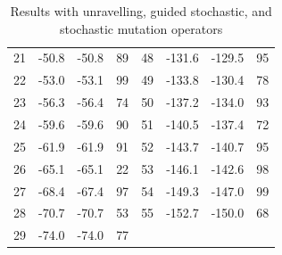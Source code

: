 \documentclass{article}
\begin{document}
\begin{table}[]
\begin{tabular}{cccc|cccc}
	21 & -50.8   & -50.8 & 89   & 48 & -131.6  & -129.5 & 95   \\
	22 & -53.0   & -53.1 & 99   & 49 & -133.8  & -130.4 & 78   \\
	23 & -56.3   & -56.4 & 74   & 50 & -137.2  & -134.0 & 93   \\
	24 & -59.6   & -59.6 & 90   & 51 & -140.5  & -137.4 & 72   \\
	25 & -61.9   & -61.9 & 91   & 52 & -143.7  & -140.7 & 95   \\
	26 & -65.1   & -65.1 & 22   & 53 & -146.1  & -142.6 & 98   \\
	27 & -68.4   & -67.4 & 97   & 54 & -149.3  & -147.0 & 99   \\
	28 & -70.7   & -70.7 & 53   & 55 & -152.7  & -150.0 & 68   \\
	29 & -74.0   & -74.0 & 77   &    &         &        &      \\

	\hline 
	\end{tabular}
	\caption{Results with unravelling, guided stochastic, and stochastic
	mutation
	operators}
 \end{table}
\end{document}
